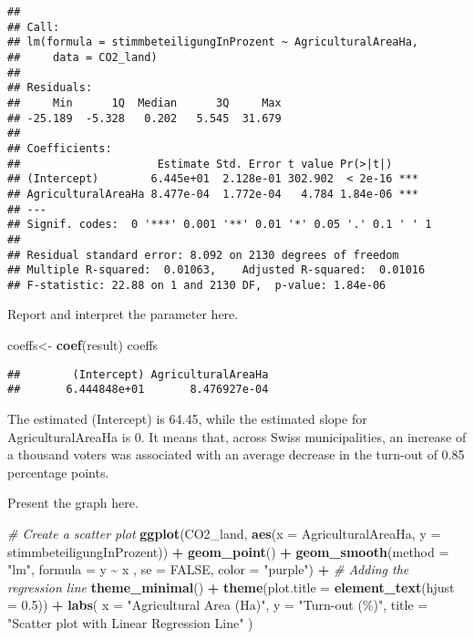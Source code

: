 \documentclass[
]{book}
\newenvironment{Shaded}{\begin{snugshade}}{\end{snugshade}}
\newcommand{\AttributeTok}[1]{\textcolor[rgb]{0.13,0.29,0.53}{#1}}
\newcommand{\CommentTok}[1]{\textcolor[rgb]{0.56,0.35,0.01}{\textit{#1}}}
\newcommand{\ConstantTok}[1]{\textcolor[rgb]{0.56,0.35,0.01}{#1}}
\newcommand{\FloatTok}[1]{\textcolor[rgb]{0.00,0.00,0.81}{#1}}
\newcommand{\FunctionTok}[1]{\textcolor[rgb]{0.13,0.29,0.53}{\textbf{#1}}}
\newcommand{\NormalTok}[1]{#1}
\newcommand{\OtherTok}[1]{\textcolor[rgb]{0.56,0.35,0.01}{#1}}
\newcommand{\SpecialCharTok}[1]{\textcolor[rgb]{0.81,0.36,0.00}{\textbf{#1}}}
\newcommand{\StringTok}[1]{\textcolor[rgb]{0.31,0.60,0.02}{#1}}
\begin{document}
\begin{verbatim}
## 
## Call:
## lm(formula = stimmbeteiligungInProzent ~ AgriculturalAreaHa, 
##     data = CO2_land)
## 
## Residuals:
##     Min      1Q  Median      3Q     Max 
## -25.189  -5.328   0.202   5.545  31.679 
## 
## Coefficients:
##                     Estimate Std. Error t value Pr(>|t|)    
## (Intercept)        6.445e+01  2.128e-01 302.902  < 2e-16 ***
## AgriculturalAreaHa 8.477e-04  1.772e-04   4.784 1.84e-06 ***
## ---
## Signif. codes:  0 '***' 0.001 '**' 0.01 '*' 0.05 '.' 0.1 ' ' 1
## 
## Residual standard error: 8.092 on 2130 degrees of freedom
## Multiple R-squared:  0.01063,    Adjusted R-squared:  0.01016 
## F-statistic: 22.88 on 1 and 2130 DF,  p-value: 1.84e-06
\end{verbatim}

Report and interpret the parameter here.

\begin{Shaded}
\begin{Highlighting}[]
\NormalTok{coeffs}\OtherTok{\textless{}{-}} \FunctionTok{coef}\NormalTok{(result)}
\NormalTok{coeffs}
\end{Highlighting}
\end{Shaded}

\begin{verbatim}
##        (Intercept) AgriculturalAreaHa 
##       6.444848e+01       8.476927e-04
\end{verbatim}

The estimated (Intercept) is 64.45, while the estimated slope for AgriculturalAreaHa is 0. It means that, across Swiss municipalities, an increase of a thousand voters was associated with an average decrease in the turn-out of 0.85 percentage points.

Present the graph here.

\begin{Shaded}
\begin{Highlighting}[]
\CommentTok{\# Create a scatter plot}
\FunctionTok{ggplot}\NormalTok{(CO2\_land, }\FunctionTok{aes}\NormalTok{(}\AttributeTok{x =}\NormalTok{ AgriculturalAreaHa, }\AttributeTok{y =}\NormalTok{ stimmbeteiligungInProzent)) }\SpecialCharTok{+}
  \FunctionTok{geom\_point}\NormalTok{() }\SpecialCharTok{+}
  \FunctionTok{geom\_smooth}\NormalTok{(}\AttributeTok{method =} \StringTok{"lm"}\NormalTok{, }\AttributeTok{formula =}\NormalTok{ y }\SpecialCharTok{\textasciitilde{}}\NormalTok{ x , }\AttributeTok{se =} \ConstantTok{FALSE}\NormalTok{, }\AttributeTok{color =} \StringTok{"purple"}\NormalTok{) }\SpecialCharTok{+}  \CommentTok{\# Adding the regression line}
  \FunctionTok{theme\_minimal}\NormalTok{() }\SpecialCharTok{+}
  \FunctionTok{theme}\NormalTok{(}\AttributeTok{plot.title =} \FunctionTok{element\_text}\NormalTok{(}\AttributeTok{hjust =} \FloatTok{0.5}\NormalTok{)) }\SpecialCharTok{+}
  \FunctionTok{labs}\NormalTok{(}
    \AttributeTok{x =} \StringTok{"Agricultural Area (Ha)"}\NormalTok{,}
    \AttributeTok{y =} \StringTok{"Turn{-}out (\%)"}\NormalTok{,}
    \AttributeTok{title =} \StringTok{"Scatter plot with Linear Regression Line"}
\NormalTok{  )}
\end{Highlighting}
\end{Shaded}
\end{document}
